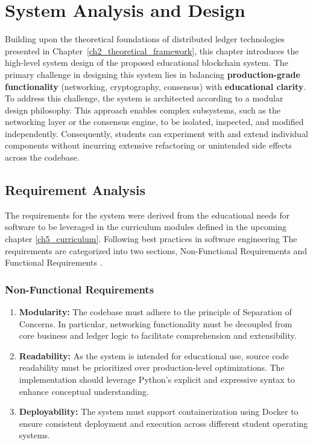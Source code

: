 \chapter{System Analysis and Design} \label{ch3_design}

Building upon the theoretical foundations of distributed ledger technologies presented in Chapter~\ref{ch2_theoretical_framework}, this chapter introduces the high-level system design of the proposed educational blockchain system. The primary challenge in designing this system lies in balancing \textbf{production-grade functionality} (networking, cryptography, consensus) with \textbf{educational clarity}. To address this challenge, the system is architected according to a modular design philosophy. This approach enables complex subsystems, such as the networking layer or the consensus engine, to be isolated, inspected, and modified independently. Consequently, students can experiment with and extend individual components without incurring extensive refactoring or unintended side effects across the codebase.

\section{Requirement Analysis}
\label{ch3_requirements}

The requirements for the system were derived from the educational needs for software to be leveraged in the curriculum modules defined in the upcoming chapter \ref{ch5_curriculum}. Following best practices in software engineering The requirements are categorized into two sections, Non-Functional Requirements and Functional Requirements \cite{sommerville2011software}.

\subsection{Non-Functional Requirements}

\begin{enumerate}
    \item \textbf{Modularity:}  
    The codebase must adhere to the principle of Separation of Concerns. In particular, networking functionality must be decoupled from core business and ledger logic to facilitate comprehension and extensibility.

    \item \textbf{Readability:}  
    As the system is intended for educational use, source code readability must be prioritized over production-level optimizations. The implementation should leverage Python’s explicit and expressive syntax to enhance conceptual understanding.

    \item \textbf{Deployability:}  
    The system must support containerization using Docker to ensure consistent deployment and execution across different student operating systems.
\end{enumerate}

